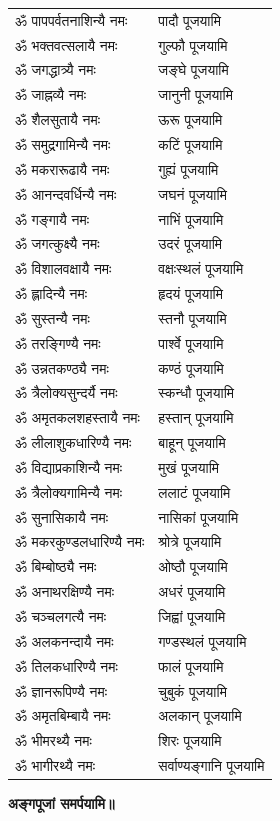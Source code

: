 \begin{center}
\begin{supertabular}{ll}
ॐ पापपर्वतनाशिन्यै नमः & पादौ पूजयामि\\
ॐ भक्तवत्सलायै नमः & गुल्फौ पूजयामि\\
ॐ जगद्धात्र्यै नमः & जङ्घे पूजयामि\\
ॐ जाह्नव्यै नमः & जानुनी पूजयामि\\
ॐ शैलसुतायै नमः & ऊरू पूजयामि\\
ॐ समुद्रगामिन्यै नमः & कटिं पूजयामि\\
ॐ मकरारूढायै नमः & गुह्यं पूजयामि\\
ॐ आनन्दवर्धिन्यै नमः & जघनं पूजयामि\\
ॐ गङ्गायै नमः & नाभिं पूजयामि\\
ॐ जगत्कुक्ष्यै नमः & उदरं पूजयामि\\
ॐ विशालवक्षायै नमः & वक्षःस्थलं पूजयामि\\
ॐ ह्लादिन्यै नमः & हृदयं पूजयामि\\
ॐ सुस्तन्यै नमः & स्तनौ पूजयामि\\
ॐ तरङ्गिण्यै नमः & पार्श्वे पूजयामि\\
ॐ उन्नतकण्ठ्यै नमः & कण्ठं पूजयामि\\
ॐ त्रैलोक्यसुन्दर्यै नमः & स्कन्धौ पूजयामि\\
ॐ अमृतकलशहस्तायै नमः & हस्तान् पूजयामि\\
ॐ लीलाशुकधारिण्यै नमः & बाहून् पूजयामि\\
ॐ विद्याप्रकाशिन्यै नमः & मुखं पूजयामि\\
ॐ त्रैलोक्यगामिन्यै नमः & ललाटं पूजयामि\\
ॐ सुनासिकायै नमः & नासिकां पूजयामि\\
ॐ मकरकुण्डलधारिण्यै नमः & श्रोत्रे पूजयामि\\
ॐ बिम्बोष्ठ्यै नमः & ओष्ठौ पूजयामि\\
ॐ अनाथरक्षिण्यै नमः & अधरं पूजयामि\\
ॐ चञ्चलगत्यै नमः & जिह्वां पूजयामि\\
ॐ अलकनन्दायै नमः & गण्डस्थलं पूजयामि\\
ॐ तिलकधारिण्यै नमः & फालं पूजयामि\\
ॐ ज्ञानरूपिण्यै नमः & चुबुकं पूजयामि\\
ॐ अमृतबिम्बायै नमः & अलकान् पूजयामि\\
ॐ भीमरथ्यै नमः & शिरः पूजयामि\\
ॐ भागीरथ्यै नमः & सर्वाण्यङ्गानि पूजयामि\\
\end{supertabular}

\textbf{अङ्गपूजां समर्पयामि॥}
\end{center}


